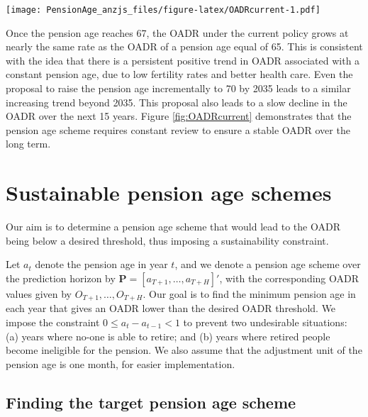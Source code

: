 \documentclass[
  doublespace]{anzsauth}
\let\origfigure\figure
\let\endorigfigure\endfigure
\renewenvironment{figure}[1][2] {
    \expandafter\origfigure\expandafter[tbp]
} {
    \endorigfigure
}
\begin{document}
\begin{figure}
\centering
\texttt{[image: PensionAge\_anzjs\_files/figure-latex/OADRcurrent-1.pdf]}
\caption{\label{fig:OADRcurrent}Fifty-year forecasts of the OADR associated with a pension age equal to 65 (green), the current approved pension age scheme (orange), and the proposed scheme with the pension age rising to 70 in 2035 (purple). The actual OADRs for 1921--2019 are shown in black.}
\end{figure}

Once the pension age reaches 67, the OADR under the current policy grows at nearly the same rate as the OADR of a pension age equal of 65. This is consistent with the idea that there is a persistent positive trend in OADR associated with a constant pension age, due to low fertility rates and better health care. Even the proposal to raise the pension age incrementally to 70 by 2035 leads to a similar increasing trend beyond 2035. This proposal also leads to a slow decline in the OADR over the next 15 years. Figure \ref{fig:OADRcurrent} demonstrates that the pension age scheme requires constant review to ensure a stable OADR over the long term.

\hypertarget{sec:target}{%
\section{Sustainable pension age schemes}\label{sec:target}}

Our aim is to determine a pension age scheme that would lead to the OADR being below a desired threshold, thus imposing a sustainability constraint.

Let \(a_t\) denote the pension age in year \(t\), and we denote a pension age scheme over the prediction horizon by \(\bm{P}=[a_{T+1},\dots,a_{T+H}]'\), with the corresponding OADR values given by \(O_{T+1},\dots,O_{T+H}\). Our goal is to find the minimum pension age in each year that gives an OADR lower than the desired OADR threshold. We impose the constraint \(0 \le a_t - a_{t-1} < 1\) to prevent two undesirable situations: (a) years where no-one is able to retire; and (b) years where retired people become ineligible for the pension. We also assume that the adjustment unit of the pension age is one month, for easier implementation.

\hypertarget{finding-the-target-pension-age-scheme}{%
\subsection{Finding the target pension age scheme}\label{finding-the-target-pension-age-scheme}}
\end{document}
